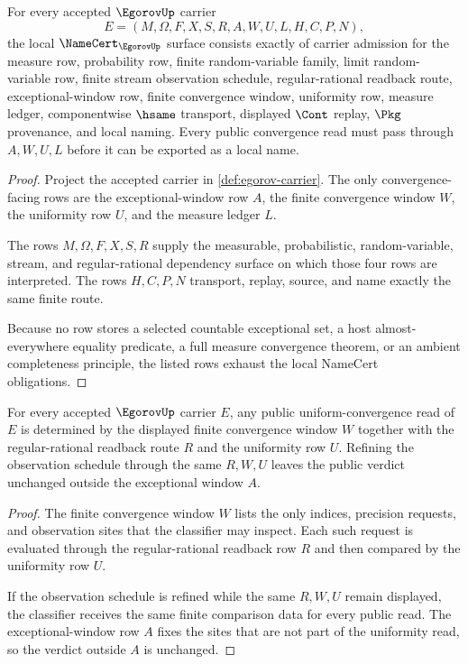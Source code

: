 \begin{theorem}\label{thm:egorov-namecert-obligations}
For every accepted $\EgorovUp$ carrier
$$
E=(M,\Omega,F,X,S,R,A,W,U,L,H,C,P,N),
$$
the local $\NameCert_{\EgorovUp}$ surface consists exactly of carrier admission for the measure row, probability row, finite random-variable family, limit random-variable row, finite stream observation schedule, regular-rational readback route, exceptional-window row, finite convergence window, uniformity row, measure ledger, componentwise $\hsame$ transport, displayed $\Cont$ replay, $\Pkg$ provenance, and local naming. Every public convergence read must pass through $A,W,U,L$ before it can be exported as a local name.
\end{theorem}
\begin{proof}
Project the accepted carrier in \autoref{def:egorov-carrier}. The only convergence-facing rows are the exceptional-window row $A$, the finite convergence window $W$, the uniformity row $U$, and the measure ledger $L$.

The rows $M,\Omega,F,X,S,R$ supply the measurable, probabilistic, random-variable, stream, and regular-rational dependency surface on which those four rows are interpreted. The rows $H,C,P,N$ transport, replay, source, and name exactly the same finite route.

Because no row stores a selected countable exceptional set, a host almost-everywhere equality predicate, a full measure convergence theorem, or an ambient completeness principle, the listed rows exhaust the local NameCert obligations.
\end{proof}

\begin{theorem}\label{thm:egorov-finite-window-uniformity}
For every accepted $\EgorovUp$ carrier $E$, any public uniform-convergence read of $E$ is determined by the displayed finite convergence window $W$ together with the regular-rational readback route $R$ and the uniformity row $U$. Refining the observation schedule through the same $R,W,U$ leaves the public verdict unchanged outside the exceptional window $A$.
\end{theorem}
\begin{proof}
The finite convergence window $W$ lists the only indices, precision requests, and observation sites that the classifier may inspect. Each such request is evaluated through the regular-rational readback row $R$ and then compared by the uniformity row $U$.

If the observation schedule is refined while the same $R,W,U$ remain displayed, the classifier receives the same finite comparison data for every public read. The exceptional-window row $A$ fixes the sites that are not part of the uniformity read, so the verdict outside $A$ is unchanged.
\end{proof}

